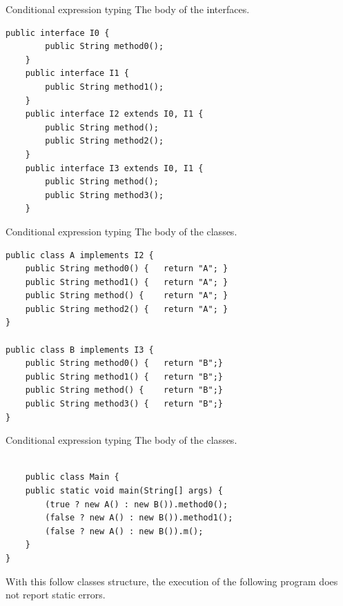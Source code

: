 \documentclass{beamer}
\begin{document}
    \begin{frame}[fragile]{Conditional expression typing}
	\boldmath
The body of the interfaces.	\begin{flushleft}
		\begin{lstlisting}[basicstyle=\scriptsize]
	public interface I0 {
	    public String method0();
    }
    public interface I1 {
        public String method1();
    }
    public interface I2 extends I0, I1 {
        public String method();
        public String method2();
    }
    public interface I3 extends I0, I1 {
        public String method();
        public String method3();
    }
	\end{lstlisting}
	\end{flushleft}
	\end{frame}

	 \begin{frame}[fragile]{Conditional expression typing}
	\boldmath
The body of the classes.	\begin{flushleft}
		\begin{lstlisting}[basicstyle=\scriptsize]
	public class A implements I2 {
	public String method0() {	return "A";	}
	public String method1() {	return "A";	}
    public String method() {	return "A";	}
	public String method2() {	return "A"; }
}

public class B implements I3 {
    public String method0() {	return "B";}
	public String method1() {	return "B";}
    public String method() {	return "B";}
    public String method3() {	return "B";}
}
	\end{lstlisting}
	\end{flushleft}

	\end{frame}

	\begin{frame}[fragile]{Conditional expression typing}
	\boldmath
The body of the classes.	\begin{flushleft}
		\begin{lstlisting}[basicstyle=\scriptsize]

    public class Main {
    public static void main(String[] args) {
		(true ? new A() : new B()).method0();
		(false ? new A() : new B()).method1();
		(false ? new A() : new B()).m();
	}
}
	\end{lstlisting}
	\end{flushleft}
	With this follow classes structure, the execution of the following program does not report static errors.
	\end{frame}
\end{document}
